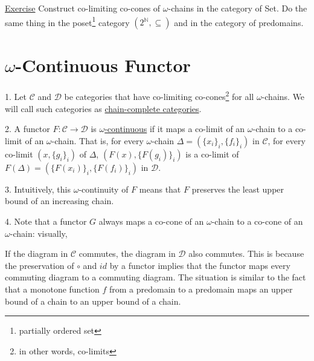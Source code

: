 \documentclass{report}[12pt]
\begin{document}
\underline{Exercise} Construct co-limiting co-cones of $\omega$-chains in the category of Set. Do the same thing in the poset\footnote{partially ordered set} category $(2^{\mathbb{N}}, \subseteq)$ and in the category of predomains.

\section{$\omega$-Continuous Functor}
1. Let $\mathcal{C}$ and $\mathcal{D}$ be categories that have co-limiting co-cones\footnote{in other words, co-limits} for all $\omega$-chains. We will call such categories as \underline{chain-complete categories}.

2. A functor $F:\mathcal{C}\rightarrow \mathcal{D}$ is \underline{$\omega$-continuous} if it maps a co-limit of an $\omega$-chain to a co-limit of an $\omega$-chain. That is, for every $\omega$-chain $\Delta = (\{x_i\}_i, \{f_i\}_i)$ in $\mathcal{C}$, for every co-limit $(x, \{g_i\}_i)$ of $\Delta$,
$(F(x), \{F(g_i)\}_i)$ is a co-limit of $F(\Delta)=(\{F(x_i)\}_i, \{F(f_i)\}_i)$ in $\mathcal{D}$.

3. Intuitively, this $\omega$-continuity of $F$ means that $F$ preserves the least upper bound of an increasing chain.

4. Note that a functor $G$ always maps a co-cone of an $\omega$-chain to a co-cone of an $\omega$-chain: visually,

{\center
{}
\par}
If the diagram in $\mathcal{C}$ commutes, the diagram in $\mathcal{D}$ also commutes. This is because the preservation of $\circ$ and $id$ by a functor implies that the functor maps every commuting diagram to a commuting diagram. The situation is similar to the fact that a monotone function $f$ from a predomain to a predomain maps an upper bound of a chain to an upper bound of a chain.
\end{document}
